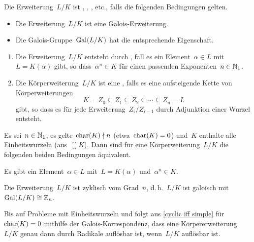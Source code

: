 \begin{definition}
  Die Erweiterung~$L/K$ ist , , , etc., falls die folgenden Bedingungen gelten.
  \begin{itemize}
    \item
      Die Erweiterung~$L/K$ ist eine Galois-Erweiterung.
    \item
      Die Galois-Gruppe~$\operatorname{Gal}(L/K)$ hat die entsprechende Eigenschaft.
  \end{itemize}
\end{definition}

\begin{definition}
  \leavevmode
  \begin{enumerate}
    \item
      Die Erweiterung~$L/K$ entsteht durch , fall es ein Element~$\alpha \in L$ mit~$L = K(\alpha)$ gibt, so dass~$\alpha^n \in K$ für einen passenden Exponenten~$n \in \mathbb{N}_1$.
    \item
      Die Körperweiterung~$L/K$ ist eine , falls es eine aufsteigende Kette von Körperweiterungen
      \[
        K = Z_0 \subseteq Z_1 \subseteq Z_2 \subseteq \dotsb \subseteq Z_n = L
      \]
      gibt, so dass es für jede Erweiterung~$Z_i / Z_{i-1}$ durch Adjunktion einer Wurzel entsteht.
  \end{enumerate}
\end{definition}

\begin{proposition}
  \label{cyclic iff simple}
  Es sei~$n \in \mathbb{N}_1$, es gelte~$\operatorname{char}(K) \nmid n$ (etwa~$\operatorname{char}(K) = 0$) und~$K$ enthalte alle~ Einheitswurzeln (aus~$\closure{K}$).
  Dann sind für eine Körperweiterung~$L/K$ die folgenden beiden Bedingungen äquivalent.
  \begin{equivlist}
    \item
      Es gibt ein Element~$\alpha \in L$ mit~$L = K(\alpha)$ und~$\alpha^n \in K$.
    \item
      Die Erweiterung~$L/K$ ist zyklisch vom Grad~$n$, d.\,h.~$L/K$ ist galoisch mit~$\operatorname{Gal}(L/K) \cong \mathbb{Z}_n$.
  \end{equivlist}
\end{proposition}

Bis auf Probleme mit Einheitswurzeln und folgt aus \cref{cyclic iff simple} für~$\operatorname{char}(K) = 0$ mithilfe der Galois-Korrespondenz, dass eine Körpererweiterung~$L/K$ genau dann durch Radikale auflösbar ist, wenn~$L/K$ auflösbar ist.


